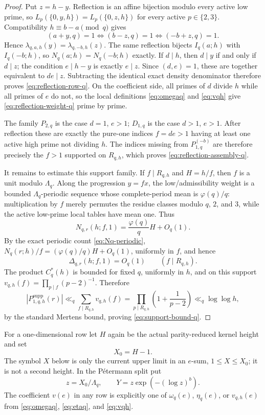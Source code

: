 \documentclass[11pt]{article}
\theoremstyle{definition}
\theoremstyle{remark}
\newcommand{\1}{\mathbf 1}
\newcommand{\ph}{\varphi}
\begin{document}
\begin{proof}
Put $z=h-y$.  Reflection is an affine bijection modulo every active low
prime, so
$L_p(\{0,y,h\})=L_p(\{0,z,h\})$ for every active
$p\in\{2,3\}$.
Compatibility $h\equiv b-a\pmod q$ gives
\[
(a+y,q)=1
\Longleftrightarrow (b-z,q)=1
\Longleftrightarrow (-b+z,q)=1.
\]
Hence
$\lambda_{q,a,h}(y)=\lambda_{q,-b,h}(z)$.
The same reflection bijects $I_q(a;h)$ with $I_q(-b;h)$, so
$N_q(a;h)=N_q(-b;h)$ exactly.  If $d\mid h$, then
$d\mid y$ if and only if $d\mid z$; the condition $e\mid h-y$
is exactly $e\mid z$.  Since $(d,e)=1$, these are together equivalent
to $de\mid z$.  Subtracting the identical exact density denominator
therefore proves \eqref{eq:reflection-row-q}.  On the coefficient side,
all primes of $d$ divide $h$ while all primes of $e$ do not, so the local
definitions \eqref{eq:omegaq} and \eqref{eq:vqh} give
\eqref{eq:reflection-weight-q} prime by prime.

The family $P_{2,q}$ is the case $d=1$, $e>1$; $D_{1,q}$ is the case
$d>1$, $e>1$.  After reflection these are exactly the pure-one indices
$f=de>1$ having at least one active high prime not dividing $h$.  The
indices missing from $P_{1,q}^{(-b)}$ are therefore precisely the
$f>1$ supported on $R_{q,h}$, which proves
\eqref{eq:reflection-assembly-q}.

It remains to estimate this support family.  If $f\mid R_{q,h}$ and $H=h/f$,
then $f$ is a unit modulo $\Lambda_q$.  Along the progression $y=fx$,
the low/admissibility weight is a bounded $\Lambda_q$-periodic sequence
whose complete-period mean is $\ph(q)/q$: multiplication by $f$ merely
permutes the residue classes modulo $q$, $2$, and $3$, while the active
low-prime local tables have mean one.  Thus
\[
N_{q,r}(h;f,1)=\frac{\ph(q)}q H+O_q(1).
\]
By the exact periodic count \eqref{eq:Nq-periodic},
$N_q(r;h)/f=(\ph(q)/q)H+O_q(1)$, uniformly in $f$, and hence
\[
\Delta_{q,r}(h;f,1)=O_q(1)
\qquad(f\mid R_{q,h}).
\]
The product $C_q^*(h)$ is bounded for fixed $q$, uniformly in $h$, and on
this support
$v_{q,h}(f)=\prod_{p\mid f}(p-2)^{-1}$.  Therefore
\[
|P_{1,q,h}^{\mathrm{supp}}(r)|
\ll_q
\sum_{f\mid R_{q,h}}v_{q,h}(f)
=\prod_{p\mid R_{q,h}}\left(1+\frac1{p-2}\right)
\ll_q\log\log h,
\]
by the standard Mertens bound, proving \eqref{eq:support-bound-q}.
\end{proof}

For a one-dimensional row let $H$ again be the actual parity-reduced kernel
height and set
\begin{equation}\label{eq:X0-contract}
\boxed{X_0=H-1.}
\end{equation}
The symbol $X$ below is only the current upper limit in an $e$-sum,
$1\le X\le X_0$; it is not a second height.  In the P\'etermann split put
\[
 z=X_0/\Lambda_q,
 \qquad
 Y=z\exp\!\left(- (\log z)^b\right).
\]
The coefficient $v(e)$ in any row is explicitly one of $\omega_q(e)$,
$\eta_q(e)$, or $v_{q,h}(e)$ from
\eqref{eq:omegaq}, \eqref{eq:etaq}, and \eqref{eq:vqh}.
\end{document}
